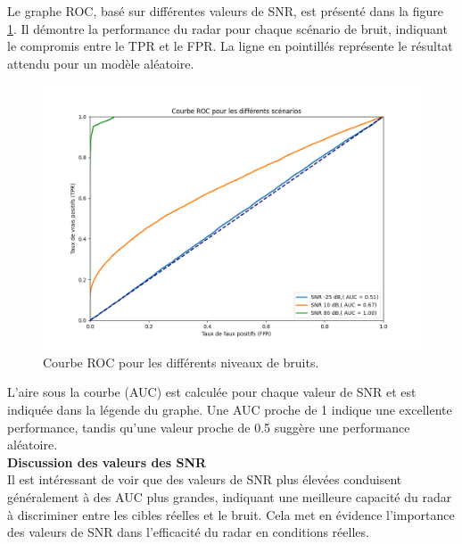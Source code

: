 Le graphe ROC, basé sur différentes valeurs de SNR, est présenté dans la figure \ref{fig:roc}. Il démontre la performance du radar pour chaque scénario de bruit, indiquant le compromis entre le TPR et le FPR. La ligne en pointillés représente le résultat attendu pour un modèle aléatoire.

\begin{figure}[H]
    \centering
    \includegraphics[width=0.8 \textwidth]{Pictures/ROC_SST_P.png}
    \caption{Courbe ROC pour les différents niveaux de bruits.}
    \label{fig:roc}
\end{figure}

L'aire sous la courbe (AUC) est calculée pour chaque valeur de SNR et est indiquée dans la légende du graphe. Une AUC proche de 1 indique une excellente performance, tandis qu'une valeur proche de 0.5 suggère une performance aléatoire.\\
\textbf{Discussion des valeurs des SNR}\\
Il est intéressant de voir que des valeurs de SNR plus élevées conduisent généralement à des AUC plus grandes, indiquant une meilleure capacité du radar à discriminer entre les cibles réelles et le bruit. Cela met en évidence l'importance des valeurs de SNR dans l'efficacité du radar en conditions réelles.
